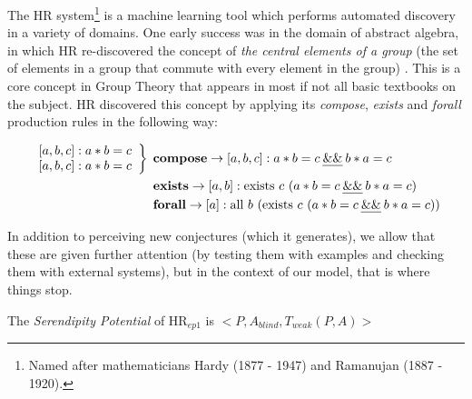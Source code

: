 \begin{ep}\label{ex:central}
The {\sf HR} system\footnote{Named after mathematicians Hardy (1877 - 1947) and Ramanujan (1887 - 1920).} \citet{colton2002automated} is a machine learning tool which performs automated discovery in a variety of domains. 
One early success was in the domain of abstract algebra, in which {\sf HR} re-discovered the concept of \emph{the central elements of a group} (the set of elements in a group that commute with every element in the group) \cite{colton2002automated}.  This is a core concept in Group Theory that appears in most if not all basic textbooks on the subject.  HR discovered this concept by applying its {\em compose}, {\em exists} and {\em forall} production rules in the following way:  

\begin{align*}
\left.
\begin{array}{c}
{[}a,b,c{]} : a*b=c\\
{[}a,b,c{]} : a*b=c
\end{array}
\right\}\:\:
&\mathbf{compose}\rightarrow [a,b,c] : a*b=c \:\text{\emph{\&\&}}\: b*a=c\\
&\mathbf{exists}\rightarrow [a,b] : \text{exists}\ c\ (a*b=c \:\text{\emph{\&\&}}\: b*a=c)\\
&\mathbf{forall}\rightarrow [a] : \text{all}\ b\ (\text{exists}\ c\ (a*b=c \:\text{\emph{\&\&}}\: b*a=c))
\end{align*}
\end{ep}

In addition to perceiving new conjectures (which it generates), we allow that these are given further attention (by testing them with examples and checking them with external systems), but in the context of our model, that is where things stop.

The {\em Serendipity Potential} of HR$_{ep1}$ is 
$<P, A_{blind}, T_{weak}(P, A)>$

